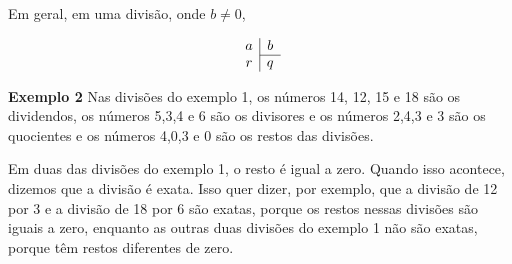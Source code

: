\begin{multicols}{2}
Em geral, em uma divisão, onde $b\not= 0$,

\[\begin{array}{c|c} a & b\\ \cline{2-2} r & q \end{array}\]

\textbf{Exemplo 2} Nas divisões do exemplo 1, os números 14, 12, 15 e 18 são os dividendos, os números 5,3,4 e 6 são os divisores e os números 2,4,3 e 3 são os quocientes e os números 4,0,3 e 0 são os restos das divisões.

Em duas das divisões do exemplo 1, o resto é igual a zero. Quando isso acontece, dizemos que a divisão é exata. Isso quer dizer, por exemplo, que a divisão de 12 por 3 e a divisão de 18 por 6 são exatas, porque os restos nessas divisões são iguais a zero, enquanto as outras duas divisões do exemplo 1 não são exatas, porque têm restos diferentes de zero.

\end{multicols}
